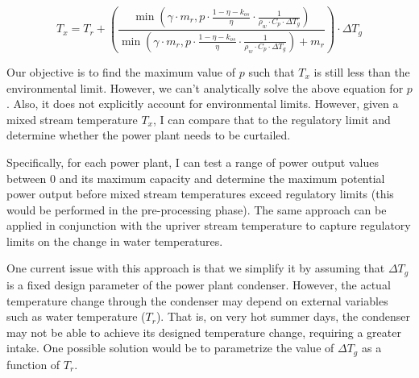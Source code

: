 \documentclass[11pt, oneside]{article}   	%
\begin{document}
\begin{equation}
T_x = T_r + \left( \frac{ \min{\left (\gamma \cdot m_r, p \cdot \frac{1-\eta - k_{os}}{\eta} \cdot \frac{1}{\rho_w \cdot C_p \cdot \Delta T_{g}}\right)}}{ \min{\left (\gamma \cdot m_r, p \cdot \frac{1-\eta - k_{os}}{\eta} \cdot \frac{1}{\rho_w \cdot C_p \cdot \Delta T_{g}}\right)} + m_r}\right)\cdot \Delta T_g
\end{equation}

Our objective is to find the maximum value of $p$ such that $T_x$ is still less than the environmental limit. However, we can't analytically solve the above equation for $p$ . Also, it does not explicitly account for environmental limits. However, given a mixed stream temperature $T_x$, I can compare that to the regulatory limit and determine whether the power plant needs to be curtailed. 

Specifically, for each power plant, I can test a range of power output values between 0 and its maximum capacity and determine the maximum potential power output before mixed stream temperatures exceed regulatory limits (this would be performed in the pre-processing phase). The same approach can be applied in conjunction with the upriver stream temperature to capture regulatory limits on the change in water temperatures.

One current issue with this approach is that we simplify it by assuming that $\Delta T_g$ is a fixed design parameter of the power plant condenser. However, the actual temperature change through the  condenser may depend on external variables such as water temperature ($T_r$). That is, on very hot summer days, the condenser may not be able to achieve its designed temperature change, requiring a greater intake. One possible solution would be to parametrize the value of $\Delta T_g$ as a function of $T_r$. 
\end{document}
